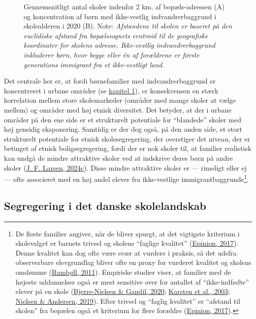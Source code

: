 \documentclass[
]{book}
\begin{document}
\begin{figure}
\centering

\caption{\label{fig:fig-3-1}Gennemsnitligt antal skoler indenfor 2 km. af bopæls-adressen (A) og koncentration af børn med ikke-vestlig indvandrerbaggrund i skolealderen i 2020 (B). Note: \emph{Afstandene til skolen er baseret på den euclidiske afstand fra bopælssognets centroid til de geografiske koordinater for skolens adresse. Ikke-vestlig indvandrerbaggrund inkluderer børn, hvor begge eller én af forældrene er første generations immigrant fra et ikke-vestligt land.}}
\end{figure}

Det centrale her er, at fordi børnefamilier med indvandrerbaggrund er koncentreret i urbane områder (se \protect\hyperlink{kap1}{kapitel 1}), er konsekvensen en stærk korrelation mellem store skolemarkeder (områder med mange skoler at vælge mellem) og områder med høj etnisk diversitet. Det betyder, at der i urbane områder på den ene side er et strukturelt potentiale for ``blandede'' skoler med høj gensidig eksponering. Samtidig er der dog også, på den anden side, et stort strukturelt potentiale for etnisk skolesegregering, der overstiger det niveau, der er betinget af etnisk boligsegregering, fordi der er nok skoler til, at familier realistisk kan undgå de mindre attraktive skoler ved at indskrive deres børn på andre skoler (\protect\hyperlink{ref-larsen2024b}{J. F. Larsen, 2024c}). Disse mindre attraktive skoler er --- rimeligt eller ej --- ofte associeret med en høj andel elever fra ikke-vestlige immigrantbaggrunde\footnote{De fleste familier angiver, når de bliver spurgt, at det vigtigste kriterium i skolevalget er barnets trivsel og skolens ``faglige kvalitet'' (\protect\hyperlink{ref-epinion2017}{Epinion, 2017}). Denne kvalitet kan dog ofte være svær at vurdere i praksis, så det udefra observerbare elevgrundlag bliver ofte en proxy for vurderet kvalitet og skolens omdømme (\protect\hyperlink{ref-rambuxf8ll2011}{Rambøll, 2011}). Empiriske studier viser, at familier med de højeste uddannelser også er mest sensitive over for antallet af ``ikke-indfødte'' elever på en skole (\protect\hyperlink{ref-bjerrenielsen2020}{Bjerre-Nielsen \& Gandil, 2020}; \protect\hyperlink{ref-karsten2003}{Karsten et al., 2003}; \protect\hyperlink{ref-nielsen2019}{Nielsen \& Andersen, 2019}). Efter trivsel og ``faglig kvalitet'' er ``afstand til skolen'' fra bopælen også et kriterium for flere forældre (\protect\hyperlink{ref-epinion2017}{Epinion, 2017}).}.

\hypertarget{segregering-i-det-danske-skolelandskab}{%
\subsection{Segregering i det danske skolelandskab}\label{segregering-i-det-danske-skolelandskab}}
\end{document}
